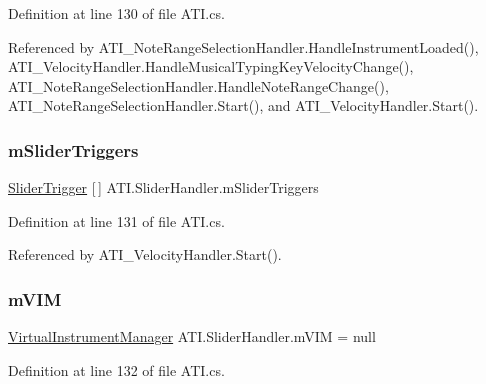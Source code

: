 Definition at line 130 of file A\+T\+I.\+cs.



Referenced by A\+T\+I\+\_\+\+Note\+Range\+Selection\+Handler.\+Handle\+Instrument\+Loaded(), A\+T\+I\+\_\+\+Velocity\+Handler.\+Handle\+Musical\+Typing\+Key\+Velocity\+Change(), A\+T\+I\+\_\+\+Note\+Range\+Selection\+Handler.\+Handle\+Note\+Range\+Change(), A\+T\+I\+\_\+\+Note\+Range\+Selection\+Handler.\+Start(), and A\+T\+I\+\_\+\+Velocity\+Handler.\+Start().

\mbox{\label{class_a_t_i_1_1_slider_handler_a20208bc52a906cf87aa9df8e5fb2c636}} 
\subsubsection{\texorpdfstring{m\+Slider\+Triggers}{mSliderTriggers}}
{\footnotesize\ttfamily \hyperlink{class_a_t_i_1_1_slider_trigger}{Slider\+Trigger} \mbox{[}$\,$\mbox{]} A\+T\+I.\+Slider\+Handler.\+m\+Slider\+Triggers\hspace{0.3cm}{\ttfamily [protected]}}



Definition at line 131 of file A\+T\+I.\+cs.



Referenced by A\+T\+I\+\_\+\+Velocity\+Handler.\+Start().

\mbox{\label{class_a_t_i_1_1_slider_handler_a5d19b4fb92b71c25a667defdda60213f}} 
\subsubsection{\texorpdfstring{m\+V\+IM}{mVIM}}
{\footnotesize\ttfamily \hyperlink{class_virtual_instrument_manager}{Virtual\+Instrument\+Manager} A\+T\+I.\+Slider\+Handler.\+m\+V\+IM = null\hspace{0.3cm}{\ttfamily [protected]}}



Definition at line 132 of file A\+T\+I.\+cs.



